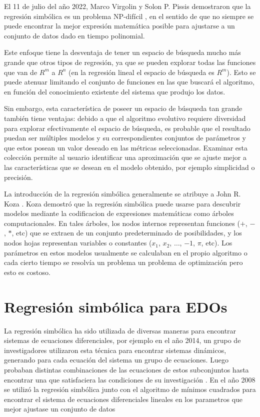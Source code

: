 El 11 de julio del año 2022, Marco Virgolin y Solon P. Pissis demostraron que la regresión simbólica es un problema NP-difícil \cite{virgolin2022symbolic}, en el sentido de que no siempre se puede encontrar la mejor expresión matemática posible para ajustarse a un conjunto de datos dado en tiempo polinomial.

Este enfoque tiene la desventaja de tener un espacio de búsqueda mucho más grande que otros tipos de regresión, ya que se pueden explorar todas las funciones que van de $R^m$ a $R^n$ (en la regresión lineal el espacio de búsqueda es $R^m$). Esto se puede atenuar limitando el conjunto de funciones en las que buscará el algoritmo, en función del conocimiento existente del sistema que produjo los datos.

Sin embargo, esta característica de poseer un espacio de búsqueda tan grande también tiene ventajas: debido a que el algoritmo evolutivo requiere diversidad para explorar efectivamente el espacio de búsqueda, es probable que el resultado puedan ser múltiples modelos y su correspondientes conjuntos de parámetros y que estos posean un valor deseado en las métricas seleccionadas. Examinar esta colección permite al usuario identificar una aproximación que se ajuste mejor a las características que se desean en el modelo obtenido, por ejemplo simplicidad o precisión.

La introducción de la regresión simbólica generalmente se atribuye a John R. Koza \cite{zelinka2005analytic}. Koza demostró que la regresión simbólica puede usarse para descubrir modelos mediante la codificacion de expresiones matemáticas como árboles computacionales. En tales árboles, los nodos internos representan funciones ($+$, $-$, $*$, etc) que se extraen de un conjunto predeterminado de posibilidades, y los nodos hojas representan variables o constantes ($x_1$, $x_2$, $\dots$, $-1$, $\pi$, etc). Los parámetros en estos modelos usualmente se calculaban en el propio algoritmo o cada cierto tiempo se resolvía un problema un problema de optimización pero esto es costoso.


\section{Regresión simbólica para EDOs}

La regresión simbólica ha sido utilizada de diversas maneras para encontrar sistemas de ecuaciones diferenciales, por ejemplo en el año 2014, un grupo de investigadores utilizaron esta técnica para encontrar sistemas dinámicos, generando para cada ecuación del sistema un grupo de ecuaciones. Luego probaban distintas combinaciones de las ecuaciones de estos subconjuntos hasta encontrar una que satisfaciera las condiciones de su investigación \cite{gaucel2014learning}. En el año 2008 se utilizó la regresión simbólica junto con el algoritmo de mínimos cuadrados para encontrar el sistema de ecuaciones diferenciales lineales en los parametros que mejor ajustase un conjunto de datos \cite{iba2008inference}

